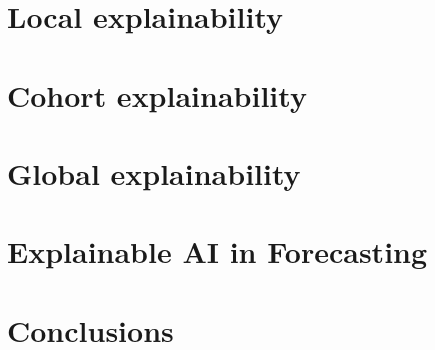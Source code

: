 
\section{Local explainability}
\label{sec:local_explainability}


\section{Cohort explainability}
\label{sec:cohort_explainability}


\section{Global explainability}
\label{sec:global_explainability}


\section{Explainable AI in Forecasting}
\label{sec:explainable_ai_in_forecasting}


\section{Conclusions}
\label{sec:interpretability_explainability_conclusions}
